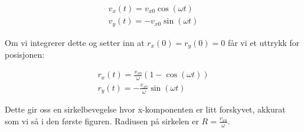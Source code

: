 \documentclass[a4paper,norsk, 10pt]{article}
\begin{document}
\begin{equation}
\begin{split}
v_x(t) = v_{x0}\cos(\omega t)
\\
v_y(t) = -v_{x0}\sin(\omega t)
\end{split}
\end{equation}

Om vi integrerer dette og setter inn at $r_x(0) = r_y(0) = 0$ får vi et uttrykk for posisjonen:

\begin{equation}
\begin{split}
r_x(t) = \frac{v_{x0}}{\omega}(1-\cos(\omega t))
\\
r_y(t) = -\frac{v_{x0}}{\omega}\sin(\omega t)
\end{split}
\end{equation}

Dette gir oss en sirkelbevegelse hvor x-komponenten er litt forskyvet, akkurat som vi så i den første figuren. Radiusen på sirkelen er $R = \frac{v_{x0}}{\omega}$. 
\end{document}

